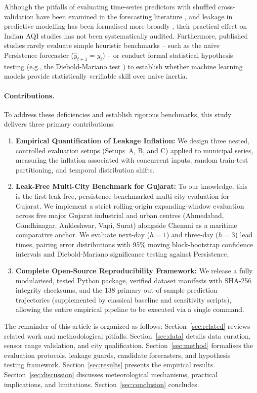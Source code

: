 Although the pitfalls of evaluating time-series predictors with shuffled cross-validation have been examined in the forecasting literature \cite{bergmeir2012}\cite{cerqueira2020}, and leakage in predictive modelling has been formalised more broadly \cite{kaufman2012}, their practical effect on Indian AQI studies has not been systematically audited. Furthermore, published studies rarely evaluate simple heuristic benchmarks -- such as the naive Persistence forecaster ($\hat{y}_{t+1} = y_t$) -- or conduct formal statistical hypothesis testing (e.g., the Diebold-Mariano test \cite{diebold1995}) to establish whether machine learning models provide statistically verifiable skill over naive inertia.

\paragraph{Contributions.}
To address these deficiencies and establish rigorous benchmarks, this study delivers three primary contributions:
\begin{enumerate}
  \item \textbf{Empirical Quantification of Leakage Inflation:} We design three nested, controlled evaluation setups (Setups~A, B, and C) applied to municipal series, measuring the inflation associated with concurrent inputs, random train-test partitioning, and temporal distribution shifts.
  \item \textbf{Leak-Free Multi-City Benchmark for Gujarat:} To our knowledge, this is the first leak-free, persistence-benchmarked multi-city evaluation for Gujarat. We implement a strict rolling-origin expanding-window evaluation across five major Gujarat industrial and urban centres (Ahmedabad, Gandhinagar, Ankleshwar, Vapi, Surat) alongside Chennai as a maritime comparative anchor. We evaluate next-day ($h=1$) and three-day ($h=3$) lead times, pairing error distributions with 95\% moving block-bootstrap confidence intervals and Diebold-Mariano significance testing against Persistence.
  \item \textbf{Complete Open-Source Reproducibility Framework:} We release a fully modularised, tested Python package, verified dataset manifests with SHA-256 integrity checksums, and the 138 primary out-of-sample prediction trajectories (supplemented by classical baseline and sensitivity scripts), allowing the entire empirical pipeline to be executed via a single command.
\end{enumerate}

The remainder of this article is organized as follows: Section~\ref{sec:related} reviews related work and methodological pitfalls. Section~\ref{sec:data} details data curation, sensor range validation, and city qualification. Section~\ref{sec:method} formalises the evaluation protocols, leakage guards, candidate forecasters, and hypothesis testing framework. Section~\ref{sec:results} presents the empirical results. Section~\ref{sec:discussion} discusses meteorological mechanisms, practical implications, and limitations. Section~\ref{sec:conclusion} concludes.

